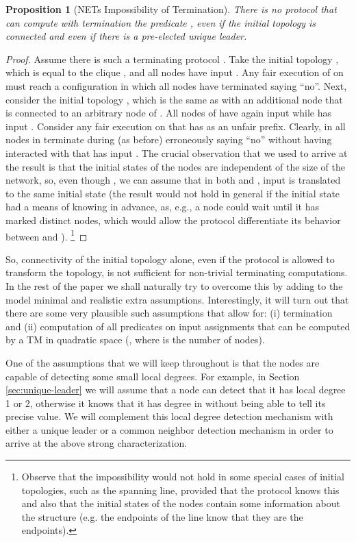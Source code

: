 \documentclass[preprint]{elsarticle}
\newtheorem{proposition}{Proposition}
\begin{document}
\begin{proposition} [NETs Impossibility of Termination] \label{pro:termination-impossibility}
There is no protocol that can compute with termination the predicate , even if the initial topology is connected and even if there is a pre-elected unique leader.
\end{proposition}
\begin{proof} 
Assume there is such a terminating protocol . Take the initial topology , which is equal to the clique , and all nodes have input . Any fair execution  of  on  must reach a configuration in which all nodes have terminated saying ``no''. Next, consider the initial topology , which is the same as  with an additional node  that is connected to an arbitrary node of . All nodes of  have again input  while  has input . Consider any fair execution  on  that has  as an unfair prefix. Clearly, in  all nodes in  terminate during  (as before) erroneously saying ``no'' without having interacted with  that has input . The crucial observation that we used to arrive at the result is that the initial states of the nodes are independent of the size of the network, so, even though , we can assume that in both  and , input  is translated to the same initial state  (the result would not hold in general if the initial state had a means of knowing  in advance, as, e.g., a node could wait until it has marked  distinct nodes, which would allow the protocol differentiate its behavior between  and ). \footnote{Observe that the impossibility would not hold in some special cases of initial topologies, such as the spanning line, provided that the protocol knows this and also that the initial states of the nodes contain some information about the structure (e.g. the endpoints of the line know that they are the endpoints).} 
\end{proof} 

So, connectivity of the initial topology alone, even if the protocol is allowed to transform the topology, is not sufficient for non-trivial terminating computations. In the rest of the paper we shall naturally try to overcome this by adding to the model minimal and realistic extra assumptions. Interestingly, it will turn out that there are some very plausible such assumptions that allow for: (i) termination and (ii) computation of all predicates on input assignments that can be computed by a TM in quadratic space (, where  is the number of nodes). 

One of the assumptions that we will keep throughout is that the nodes are capable of detecting some small local degrees. For example, in Section \ref{sec:unique-leader} we will assume that a node can detect that it has local degree 1 or 2, otherwise it knows that it has degree in  without being able to tell its precise value. We will complement this local degree detection mechanism with either a unique leader or a common neighbor detection mechanism in order to arrive at the above strong characterization. 
\end{document}
